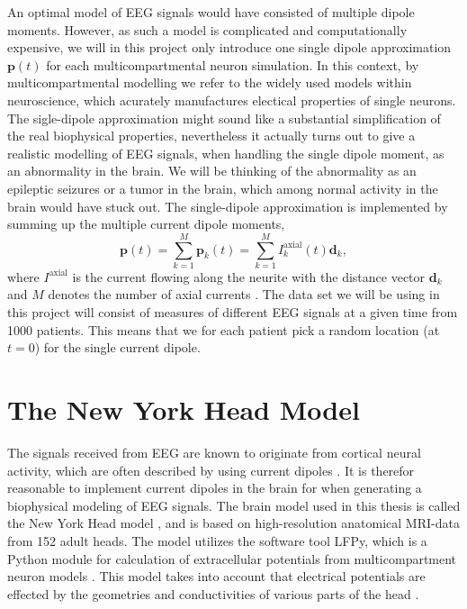 \documentclass[a4paper, UKenglish, 11pt]{uiomaster}
\begin{document}
An optimal model of EEG signals would have consisted of multiple dipole moments. However, as such a model is complicated and computationally expensive, we will in this project only introduce one single dipole approximation $\textbf{p}(t)$ for each multicompartmental neuron simulation. In this context, by  multicompartmental modelling we refer to the widely used models within neuroscience, which acurately manufactures electical properties of single neurons. The sigle-dipole approximation might sound like a substantial simplification of the real biophysical properties, nevertheless it actually turns out to give a realistic modelling of EEG signals, when handling the single dipole moment, as an abnormality in the brain. We will be thinking of the abnormality as an epileptic seizures or a tumor in the brain, which among normal activity in the brain would have stuck out. The single-dipole approximation is implemented by summing up the multiple current dipole moments,
\begin{equation*}
    \textbf{p}(t) = \sum_{k=1}^M \textbf{p}_k(t) = \sum_{k=1}^M I_k^{\text{axial}}(t)\textbf{d}_k,
\end{equation*}
where $I^{\text{axial}}$ is the current flowing along the neurite with the distance vector $\textbf{d}_k$ and $M$ denotes the number of axial currents \cite{95}. The data set we will be using in this project will consist of measures of different EEG signals at a given time from 1000 patients. This means that we for each patient pick a random location (at $t=0$) for the single current dipole.

\section{The New York Head Model}
The signals received from EEG are known to originate from cortical neural activity, which are often described by using current dipoles \cite{95}. It is therefor reasonable to implement current dipoles in the brain for when generating a biophysical modeling of EEG signals. The brain model used in this thesis is called the New York Head model \cite{96}, and is based on high-resolution anatomical MRI-data from 152 adult heads. The model utilizes the software tool LFPy, which is a Python module for calculation of extracellular potentials from multicompartment neuron models \cite{100}. This model takes into account that electrical potentials are effected by the geometries and conductivities of various parts of the head \cite{95}.
\end{document}
